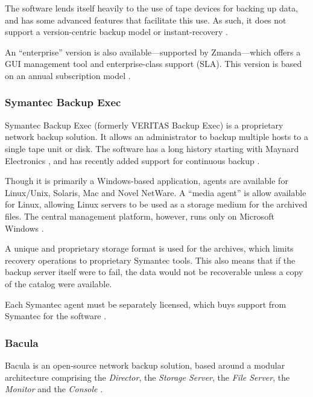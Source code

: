 The software lends itself heavily to the use of tape devices for backing up
data, and has some advanced features that facilitate this use. As such, it does
not support a version-centric backup model or
instant-recovery \cite{AMANDA-about}.

An ``enterprise'' version is also available---supported by Zmanda---which
offers a GUI management tool and enterprise-class support (SLA).  This version
is based on an annual subscription model \cite{AMANDA-ent}.

\subsubsection{Symantec Backup Exec}

Symantec Backup Exec (formerly VERITAS Backup Exec) is a proprietary network
backup solution. It allows an administrator to backup multiple hosts to
a single tape unit or disk. The software has a long history starting with
Maynard Electronics \cite{Symantec-history}, and has recently added support for
continuous backup \cite{Symantec-about}.

Though it is primarily a Windows-based application, agents are available for
Linux/Unix, Solaris, Mac and Novel NetWare. A ``media agent'' is allow
available for Linux, allowing Linux servers to be used as a storage medium for
the archived files. The central management platform, however, runs only on
Microsoft Windows \cite{Symantec-about}.

A unique and proprietary storage format is used for the archives, which limits
recovery operations to proprietary Symantec tools. This also means that if the
backup server itself were to fail, the data would not be recoverable unless
a copy of the catalog were available.

Each Symantec agent must be separately licensed, which buys support from
Symantec for the software \cite{Symantec-about}.

\subsubsection{Bacula}

Bacula is an open-source network backup solution, based around a modular
architecture comprising the \emph{Director}, the \emph{Storage Server}, the
\emph{File Server}, the \emph{Monitor} and the
\emph{Console} \cite{Bacula-about}.

